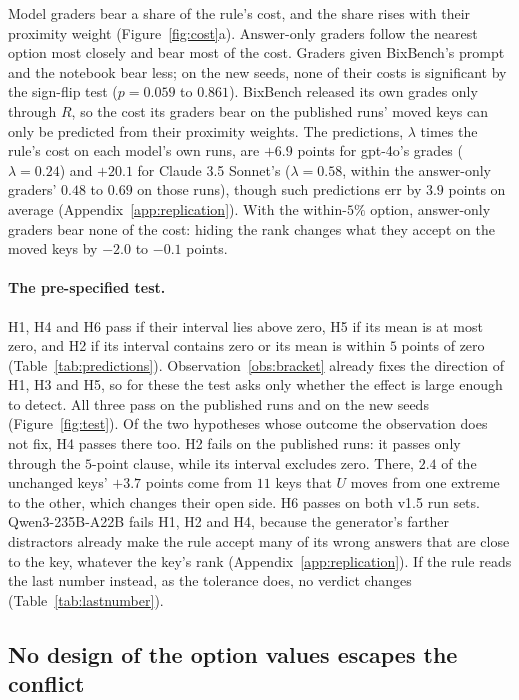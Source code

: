 \documentclass{article}
\begin{document}
Model graders bear a share of the rule's cost, and the share rises with their proximity weight
(Figure~\ref{fig:cost}a). Answer-only graders follow the nearest option most closely and bear most of the cost.
Graders given BixBench's prompt and the notebook bear less; on the new seeds, none of their costs is significant by
the sign-flip test ($p=0.059$ to $0.861$). BixBench released its own grades only through $R$, so the cost its graders
bear on the published runs' moved keys can only be predicted from their proximity weights. The predictions, $\lambda$
times the rule's cost on each model's own runs, are $+6.9$ points for gpt-4o's grades ($\lambda=0.24$) and $+20.1$ for
Claude 3.5 Sonnet's ($\lambda=0.58$, within the answer-only graders' $0.48$ to $0.69$ on those runs), though such
predictions err by $3.9$ points on average (Appendix~\ref{app:replication}). With the within-$5\%$ option, answer-only graders
bear none of the cost: hiding the rank changes what they accept on the moved keys by $-2.0$ to $-0.1$ points.

\paragraph{The pre-specified test.} H1, H4 and H6 pass if their interval lies above zero, H5 if its mean is at most zero,
and H2 if its interval contains zero or its mean is within $5$ points of zero (Table~\ref{tab:predictions}). Observation~\ref{obs:bracket} already fixes the direction of
H1, H3 and H5, so for these the test asks only whether the effect is large enough to detect. All three pass on the
published runs and on the new seeds (Figure~\ref{fig:test}). Of the two hypotheses whose outcome the observation does
not fix, H4 passes there too. H2 fails on the published runs: it passes only through the $5$-point clause, while its
interval excludes zero. There, $2.4$ of the unchanged keys' $+3.7$ points come from $11$ keys that $U$ moves from one
extreme to the other, which changes their open side. H6 passes on both v1.5 run sets. Qwen3-235B-A22B fails H1, H2 and
H4, because the generator's farther distractors already make the rule accept many of its wrong answers that are close
to the key, whatever the key's rank (Appendix~\ref{app:replication}). If the rule reads the last
number instead, as the tolerance does, no verdict changes (Table~\ref{tab:lastnumber}).

\subsection{No design of the option values escapes the conflict}
\label{sec:design}
\end{document}
